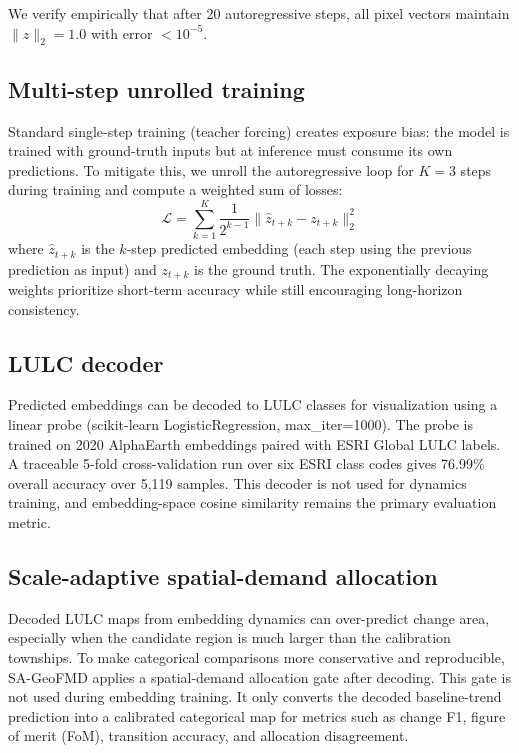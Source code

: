 \documentclass{article}
\begin{document}
We verify empirically that after 20 autoregressive steps, all pixel vectors maintain $\|z\|_2 = 1.0$ with error $<10^{-5}$.

\subsection{Multi-step unrolled training}
\label{sec:multistep}

Standard single-step training (teacher forcing) creates exposure bias: the model is trained with ground-truth inputs but at inference must consume its own predictions. To mitigate this, we unroll the autoregressive loop for $K=3$ steps during training and compute a weighted sum of losses:
\begin{equation}
\mathcal{L} = \sum_{k=1}^{K} \frac{1}{2^{k-1}} \|\hat{z}_{t+k} - z_{t+k}\|_2^2
\end{equation}
where $\hat{z}_{t+k}$ is the $k$-step predicted embedding (each step using the previous prediction as input) and $z_{t+k}$ is the ground truth. The exponentially decaying weights prioritize short-term accuracy while still encouraging long-horizon consistency.

\subsection{LULC decoder}

Predicted embeddings can be decoded to LULC classes for visualization using a linear probe (scikit-learn LogisticRegression, max\_iter=1000). The probe is trained on 2020 AlphaEarth embeddings paired with ESRI Global LULC labels. A traceable 5-fold cross-validation run over six ESRI class codes gives 76.99\% overall accuracy over 5,119 samples. This decoder is not used for dynamics training, and embedding-space cosine similarity remains the primary evaluation metric.

\subsection{Scale-adaptive spatial-demand allocation}
\label{sec:scale_adaptive_allocation}

Decoded LULC maps from embedding dynamics can over-predict change area, especially when the candidate region is much larger than the calibration townships. To make categorical comparisons more conservative and reproducible, SA-GeoFMD applies a spatial-demand allocation gate after decoding. This gate is not used during embedding training. It only converts the decoded baseline-trend prediction into a calibrated categorical map for metrics such as change F1, figure of merit (FoM), transition accuracy, and allocation disagreement.
\end{document}

